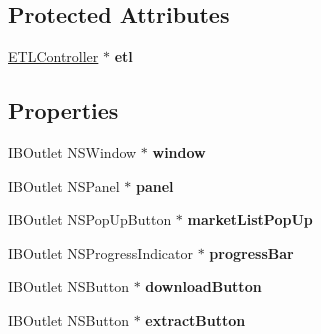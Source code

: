 \subsection*{Protected Attributes}
\begin{DoxyCompactItemize}
\item 
\hypertarget{interface_app_delegate_aa72c2793a14e858e0d3ea737863e3aa2}{\hyperlink{interface_e_t_l_controller}{E\-T\-L\-Controller} $\ast$ {\bfseries etl}}\label{interface_app_delegate_aa72c2793a14e858e0d3ea737863e3aa2}

\end{DoxyCompactItemize}
\subsection*{Properties}
\begin{DoxyCompactItemize}
\item 
\hypertarget{interface_app_delegate_acdf10c46711b4d6a8d95def15620afb6}{I\-B\-Outlet N\-S\-Window $\ast$ {\bfseries window}}\label{interface_app_delegate_acdf10c46711b4d6a8d95def15620afb6}

\item 
\hypertarget{interface_app_delegate_a5f17d26426845d65ba464565b1641ebe}{I\-B\-Outlet N\-S\-Panel $\ast$ {\bfseries panel}}\label{interface_app_delegate_a5f17d26426845d65ba464565b1641ebe}

\item 
\hypertarget{interface_app_delegate_a5fc28320bedb8fc9afbec77a427d8441}{I\-B\-Outlet N\-S\-Pop\-Up\-Button $\ast$ {\bfseries market\-List\-Pop\-Up}}\label{interface_app_delegate_a5fc28320bedb8fc9afbec77a427d8441}

\item 
\hypertarget{interface_app_delegate_a62d07b7bbae7ceb333f9366c7a5de5c6}{I\-B\-Outlet N\-S\-Progress\-Indicator $\ast$ {\bfseries progress\-Bar}}\label{interface_app_delegate_a62d07b7bbae7ceb333f9366c7a5de5c6}

\item 
\hypertarget{interface_app_delegate_aa8dcc17d352cb1c927bb57b6710359bb}{I\-B\-Outlet N\-S\-Button $\ast$ {\bfseries download\-Button}}\label{interface_app_delegate_aa8dcc17d352cb1c927bb57b6710359bb}

\item 
\hypertarget{interface_app_delegate_abbda2be929e5875ec9fa1b23ae614adf}{I\-B\-Outlet N\-S\-Button $\ast$ {\bfseries extract\-Button}}\label{interface_app_delegate_abbda2be929e5875ec9fa1b23ae614adf}


\end{DoxyCompactItemize}

